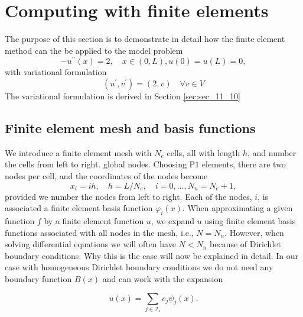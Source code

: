 \documentclass[../main.tex]{subfiles}
\begin{document}
		\chapter{Computing with finite elements}
	\label{chap:chap_13}
	
	\noindent The purpose of this section is to demonstrate in detail how the finite element method can the be applied to the model problem
	$$
	-u^{\prime \prime}(x)=2, \quad x \in(0, L), u(0)=u(L)=0,
	$$
	with variational formulation
	$$
	\left(u^{\prime}, v^{\prime}\right)=(2, v) \quad \forall v \in V
	$$
	The variational formulation is derived in Section \ref{sec:sec_11_10}
	
	\section[Finite element mesh and basis functions]{Finite element mesh and basis functions}
		\label{sec:sec_13_1}
		
		\noindent We introduce a finite element mesh with $N_{e}$ cells, all with length $h$, and number the cells from left to right. global nodes. Choosing $\mathrm{P} 1$ elements, there are two nodes per cell, and the coordinates of the nodes become
		$$
		x_{i}=i h, \quad h=L / N_{e}, \quad i=0, \ldots, N_{n}=N_{e}+1,
		$$
		provided we number the nodes from left to right.\smallbreak
		Each of the nodes, $i$, is associated a finite element basis function $\varphi_{i}(x)$. When approximating a given function $f$ by a finite element function $u$, we expand $u$ using finite element basis functions associated with all nodes in the mesh, i.e., $N=N_{n}$. However, when solving differential equations we will often have $N<N_{n}$ because of Dirichlet boundary conditions. Why this is the case will now be explained in detail.\smallbreak
		In our case with homogeneous Dirichlet boundary conditions we do not need any boundary function $B(x)$ and can work with the expansion
		
		\begin{equation}
		\label{eqa170}
			u(x)=\sum_{j \in \mathcal{I}_{s}} c_{j} \psi_{j}(x) .
		\end{equation}
	
\end{document}

